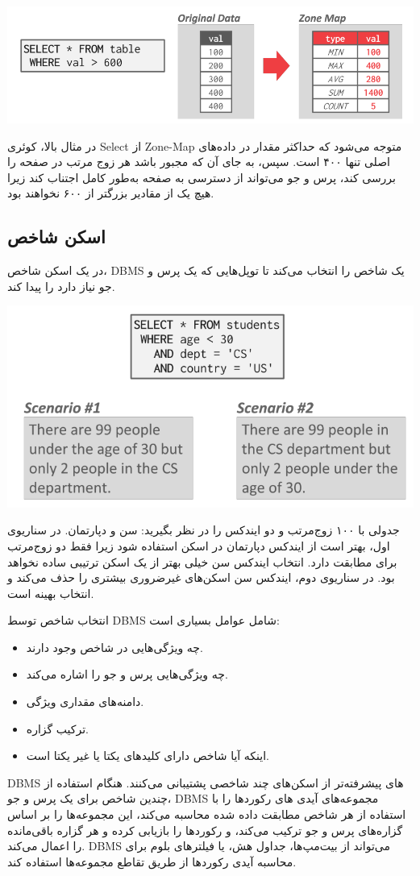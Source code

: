\qquad\qquad\qquad	\includegraphics[width=0.7\linewidth]{screenshot004}

در مثال بالا، کوئری Select از Zone-Map متوجه می‌شود که حداکثر مقدار در داده‌های اصلی تنها ۴۰۰ است. 
سپس، به جای آن که مجبور باشد هر زوج مرتب در صفحه را بررسی کند، پرس و جو می‌تواند از دسترسی به صفحه به‌طور کامل اجتناب کند زیرا هیچ یک از مقادیر بزرگتر از ۶۰۰ نخواهند بود.



\subsection{اسکن شاخص}
در یک اسکن شاخص، DBMS یک شاخص را انتخاب می‌کند تا توپل‌هایی که یک پرس و جو نیاز دارد را پیدا کند.

\qquad\qquad\qquad	\includegraphics[width=0.7\linewidth]{screenshot005}

جدولی با ۱۰۰ زوج‌مرتب و دو ایندکس را در نظر بگیرید: سن و دپارتمان. 
در سناریوی اول، بهتر است از ایندکس دپارتمان در اسکن استفاده شود زیرا فقط دو زوج‌مرتب برای مطابقت دارد. 
انتخاب ایندکس سن خیلی بهتر از یک اسکن ترتیبی ساده نخواهد بود. 
در سناریوی دوم، ایندکس سن اسکن‌های غیرضروری بیشتری را حذف می‌کند و انتخاب بهینه است.


انتخاب شاخص توسط DBMS شامل عوامل بسیاری است:
\begin{itemize}
	\item چه ویژگی‌هایی در شاخص وجود دارند.
	\item چه ویژگی‌هایی پرس و جو را اشاره می‌کند.
	\item دامنه‌های مقداری ویژگی.
	\item ترکیب گزاره.
	\item اینکه آیا شاخص دارای کلیدهای یکتا یا غیر یکتا است.
\end{itemize}
DBMS
های پیشرفته‌تر از اسکن‌های چند شاخصی پشتیبانی می‌کنند. هنگام استفاده از چندین شاخص برای یک پرس و جو، DBMS مجموعه‌های آیدی های رکوردها را با استفاده از هر شاخص مطابقت داده شده محاسبه می‌کند، این مجموعه‌ها را بر اساس گزاره‌های پرس و جو ترکیب می‌کند، و رکوردها را بازیابی کرده و هر گزاره باقی‌مانده را اعمال می‌کند. DBMS می‌تواند از بیت‌مپ‌ها، جداول هش، یا فیلترهای بلوم برای محاسبه آیدی رکوردها از طریق تقاطع مجموعه‌ها استفاده کند.
\pagebreak

